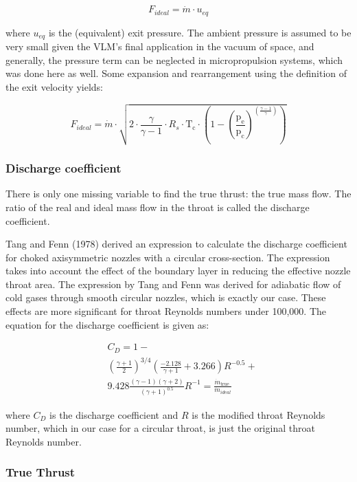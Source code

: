 \documentclass{homework}
\begin{document}
\begin{multicols}{2}
		  $$F_{i deal}=\dot{m} \cdot u_{e q}$$  
		    
		  where $u_{eq}$ is the (equivalent) exit pressure. The ambient pressure is assumed to be very small given the VLM's final application in the vacuum of space, and generally, the pressure term can be neglected in micropropulsion systems, which was done here as well. Some expansion and rearrangement using the definition of the exit velocity yields:  
		    
$$
		  F_{ideal} = \dot{m} \cdot \sqrt{2 \cdot \frac{\gamma}{\gamma-1} \cdot R_s \cdot \mathrm{T}_{\mathrm{c}} \cdot\left(1-\left(\frac{\mathrm{p}_{\mathrm{e}}}{\mathrm{p}_{\mathrm{c}}}\right)^{\left(\frac{\gamma-1}{\gamma}\right)}\right)}
		  $$

\subsubsection{Discharge coefficient}
		    
		  There is only one missing variable to find the true thrust: the true mass flow. The ratio of the real and ideal mass flow in the throat is called the discharge coefficient.  
		    
		  Tang and Fenn (1978) derived an expression to calculate the discharge coefficient for choked axisymmetric nozzles with a circular cross-section. The expression takes into account the effect of the boundary layer in reducing the effective nozzle throat area. The expression by Tang and Fenn was derived for adiabatic flow of cold gases through smooth circular nozzles, which is exactly our case. These effects are more significant for throat Reynolds numbers under 100,000. The equation for the discharge coefficient is given as:  
		    
        \begin{align*}
            &C_D=1-\\
            &\left(\frac{\gamma+1}{2}\right)^{3/4}\left(\frac{-2.128}{\gamma+1}+3.266\right) R^{-0.5}+\\
            &9.428 \frac{(\gamma-1)(\gamma+2)}{(\gamma+1)^{0.5}} R^{-1} = \frac{\dot{m}_{\text {true }}}{\dot{m}_{ideal}}
        \end{align*}
 		    
		  where $C_D$ is the discharge coefficient and $R$ is the modified throat Reynolds number, which in our case for a circular throat, is just the original throat Reynolds number.  
\subsubsection{True Thrust}
		    

\end{multicols}
\end{document}
